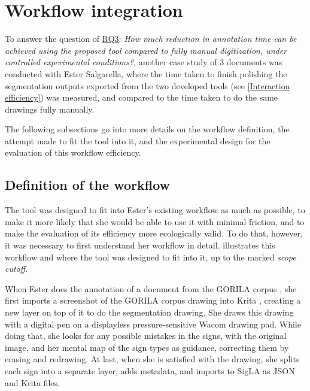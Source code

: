 \section{Workflow integration} \label{Workflow efficiency}
To answer the question of \hyperref[rq3]{\acs{RQ}3}: \textit{How much reduction in annotation time can be achieved using the proposed tool compared to fully manual digitization, under controlled experimental conditions?}, another case study of 3 documents was conducted with Ester Salgarella, where the time taken to finish polishing the segmentation outputs exported from the two developed tools (see \cref{Interaction efficiency}) was measured, and compared to the time taken to do the same drawings fully manually.

The following subsections go into more details on the workflow definition, the attempt made to fit the tool into it, and the experimental design for the evaluation of this workflow efficiency.

\subsection{Definition of the workflow}
\label{subsection:definition_of_workflow}
The tool was designed to fit into Ester's existing workflow as much as possible, to make it more likely that she would be able to use it with minimal friction, and to make the evaluation of its efficiency more ecologically valid.
To do that, however, it was necessary to first understand her workflow in detail.
 illustrates this workflow and where the tool was designed to fit into it, up to the marked \textit{scope cutoff}.



When Ester does the annotation of a document from the \acs{GORILA} corpus \parencite{EtudesCretoises21}, she first imports a screenshot of the \acs{GORILA} corpus drawing into Krita \parencite{KritaDocs}, creating a new layer on top of it to do the segmentation drawing.
She draws this drawing with a digital pen on a displayless pressure-sensitive Wacom drawing pad.
While doing that, she looks for any possible mistakes in the signs, with the original image, and her mental map of the sign types as guidance, correcting them by erasing and redrawing.
At last, when she is satisfied with the drawing, she splits each sign into a separate layer, adds metadata, and imports to SigLA \parencite{SalgarellaCastellanSigLA2020} as JSON and Krita files.

